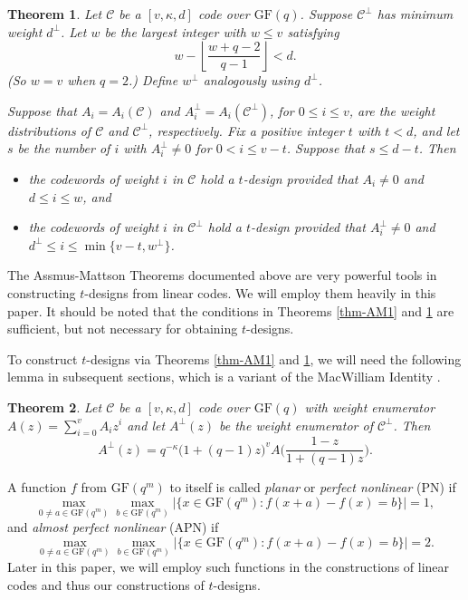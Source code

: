 \documentclass[1p,final]{elsarticle}
\newtheorem{theorem}{Theorem}
\newcommand{\gf}{{\mathrm{GF}}}
\newcommand{\C}{{\mathcal{C}}}
\begin{document}
\begin{theorem}\label{thm-AM2} 
Let $\C$ be a $[v, \kappa, d]$ code over $\gf(q)$. Suppose $\C^\perp$ has minimum weight $d^\perp$.
Let $w$ be the largest integer with $w \leq v$ satisfying
$$
w - \left\lfloor \frac{w+q-2}{q-1} \right\rfloor < d.
$$
(So $w=v$ when $q=2$.) Define $w^\perp$ analogously using $d^\perp$.

Suppose that $A_i=A_i(\C)$ and $A_i^\perp=A_i(\C^\perp)$, for $0 \leq i \leq v$, are the
weight distributions of $\C$ and $\C^\perp$, respectively. Fix a positive integer $t$
with $t < d$, and let $s$ be the number of $i$ with $A_i^\perp \ne 0$ for $0 < i \leq v-t$.
Suppose that $s \leq d -t$. Then
\begin{itemize}
\item the codewords of weight $i$ in $\C$ hold a $t$-design provided that $A_i \ne 0$ and
      $d \leq i \leq w$, and
\item the codewords of weight $i$ in $\C^\perp$ hold a $t$-design provided that
      $A_i^\perp \ne 0$ and $d^\perp \leq i \leq \min\{v-t, w^\perp\}$.
\end{itemize}
\end{theorem}

The Assmus-Mattson Theorems documented above are very powerful tools in constructing $t$-designs 
from linear codes. We will employ them heavily in this paper. It should be noted that the conditions 
in Theorems \ref{thm-AM1} and \ref{thm-AM2} are sufficient, but not necessary for obtaining 
$t$-designs. 

To construct $t$-designs via Theorems \ref{thm-AM1} and \ref{thm-AM2}, we will need the 
following lemma in subsequent sections, which is a variant of the MacWilliam Identity 
\cite[p. 41]{vanLint}. 

\begin{theorem} \label{thm-MI}
Let $\C$ be a $[v, \kappa, d]$ code over $\gf(q)$ with weight enumerator $A(z)=\sum_{i=0}^v A_iz^i$ and let
$A^\perp(z)$ be the weight enumerator of $\C^\perp$. Then
$$A^\perp(z)=q^{-\kappa}\Big(1+(q-1)z\Big)^vA\Big(\frac {1-z} {1+(q-1)z}\Big).$$
\end{theorem}

A function $f$ from $\gf(q^m)$ to itself is called  {\em planar} or \textit{perfect nonlinear} (PN) if
  \[\max_{0\ne a\in\gf(q^m)}\max_{b\in\gf(q^m)}|\{x\in\gf(q^m): f(x+a)-f(x)=b\}|=1,\]
and {\em almost perfect nonlinear} (APN) if
  \[\max_{0\ne a\in\gf(q^m)}\max_{b\in\gf(q^m)}|\{x\in\gf(q^m): f(x+a)-f(x)=b\}|=2.\]
Later in this paper, we will employ such functions in the constructions of linear codes and thus 
our constructions of $t$-designs.  
\end{document}
